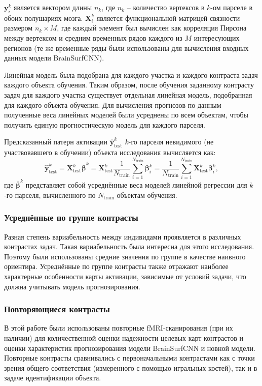 $\boldsymbol{y}_i^k$ является вектором длины $n_k$, где $n_k$ -- количество вертексов в $k$-ом парселе в обоих полушариях мозга.
$\boldsymbol{X}_i^k$ является функциональной матрицей связности размером  $n_k \times M$, где каждый элемент был вычислен как корреляция Пирсона между вертексом и средним временных рядов каждого из $M$ интересующих регионов (те же временные ряды были использованы для вычисления входных данных модели BrainSurfCNN).
 
Линейная модель была подобрана для каждого участка и каждого контраста задач каждого объекта обучения.
Таким образом, после обучения заданному контрасту задач для каждого участка существует отдельная линейная модель, подобранная для каждого объекта обучения.
Для вычисления прогнозов по данным полученные веса линейных моделей были усреднены по всем объектам, чтобы получить единую прогностическую модель для каждого парселя.

Предсказанный патерн активации $\hat{\boldsymbol{y}}_{\text{test}}^k$ $k$-го парселя невидимого (не участвовавшего в обучении) объекта исследования вычисляется как:
\begin{equation}
\hat{\boldsymbol{y}}_{\text{test}}^k = {\boldsymbol{X}}_{\text{test}}^k \bar{\boldsymbol{\beta}}^k = {\boldsymbol{X}}_{\text{test}}^k \frac{1}{N_{\text{train}}} \sum_{i=1}^{N_{\text{train}}} {\boldsymbol{\beta}}_i^k = \frac{1}{N_{\text{train}}} \sum_{i=1}^{N_{\text{train}}} {\boldsymbol{X}}_{\text{test}}^k {\boldsymbol{\beta}}_i^k,
\end{equation} 
где $\bar{\boldsymbol{\beta}}^k$ представляет собой усреднённые веса моделей линейной регрессии для $k$-го парселя, вычисленного по $N_\text{train}$ объектам обучения.


\subsubsection{Усреднённые по группе контрасты}
Разная степень вариабельность между индивидами проявляется в различных контрастах задач.
Такая вариабельность была интересна для этого исследования.
Поэтому были использованы средние значения по группе в качестве наивного ориентира.
Усреднённые по группе контрасты также отражают наиболее характерные особенности карты активации, зависимые от условий задачи, что должна учитывать модель прогнозирования.


\subsubsection{Повторяющиеся контрасты}
В этой работе были использованы повторные fMRI-сканирования (при их наличии) для количественной оценки надежности целевых карт контрастов и оценки характеристик прогнозирования модели BrainSurfCNN и новной модели.
Повторные контрасты сравнивались с первоначальными контрастами как с точки зрения общего соответствия (измеренного с помощью игральных костей), так и в задаче идентификации объекта.


